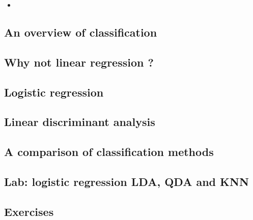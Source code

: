 \begin{itemize}
	\item
 \end{itemize}
\subsection{An overview of classification}

\subsection{Why not linear regression ?}

\subsection{Logistic regression}

\subsection{Linear discriminant analysis}

\subsection{A comparison of classification methods}

\subsection{Lab: logistic regression LDA, QDA and KNN}

\subsection{Exercises}

